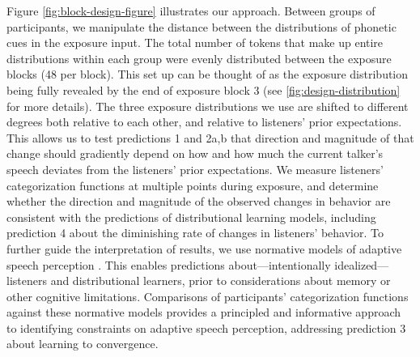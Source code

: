 \documentclass[
  11pt,
  man,mask,floatsintext]{apa6}
\begin{document}
Figure \ref{fig:block-design-figure} illustrates our approach. Between groups of participants, we manipulate the distance between the distributions of phonetic cues in the exposure input. The total number of tokens that make up entire distributions within each group were evenly distributed between the exposure blocks (48 per block). This set up can be thought of as the exposure distribution being fully revealed by the end of exposure block 3 (see \ref{fig:design-distribution} for more details). The three exposure distributions we use are shifted to different degrees both relative to each other, and relative to listeners' prior expectations. This allows us to test predictions 1 and 2a,b that direction and magnitude of that change should gradiently depend on how and how much the current talker's speech deviates from the listeners' prior expectations. We measure listeners' categorization functions at multiple points during exposure, and determine whether the direction and magnitude of the observed changes in behavior are consistent with the predictions of distributional learning models, including prediction 4 about the diminishing rate of changes in listeners' behavior. To further guide the interpretation of results, we use normative models of adaptive speech perception \autocites[ideal observers and adaptors,][]{feldman2009,kleinschmidt-jaeger2015,massaro1989,xie2023}. This enables predictions about---intentionally idealized---listeners and distributional learners, prior to considerations about memory or other cognitive limitations. Comparisons of participants' categorization functions against these normative models provides a principled and informative approach to identifying constraints on adaptive speech perception, addressing prediction 3 about learning to convergence.
\end{document}
